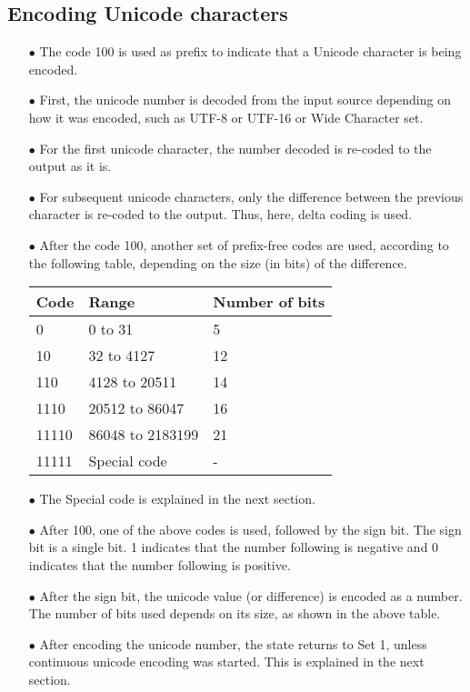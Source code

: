 \documentclass[]{article}
\begin{document}
\subsection{Encoding Unicode characters}
\begin{itemize}
	\item[$\bullet$] The code 100 is used as prefix to indicate that a Unicode character is being encoded.
	\item[$\bullet$] First, the unicode number is decoded from the input source depending on how it was encoded, such as UTF-8 or UTF-16 or Wide Character set.
	\item[$\bullet$] For the first unicode character, the number decoded is re-coded to the output as it is.
	\item[$\bullet$] For subsequent unicode characters, only the difference between the previous character is re-coded to the output.  Thus, here, delta coding is used.
	\item[$\bullet$] After the code 100, another set of prefix-free codes are used, according to the following table, depending on the size (in bits) of the difference.
	\item[] \begin{tabular}{ | l | l | l |} \hline
	﻿\textbf{Code} & ﻿\textbf{Range} & ﻿\textbf{Number of bits} \\ \hline
	0 & 0 to 31 & 5 \\ \hline
	10 & 32 to 4127 & 12 \\ \hline
	110 & 4128 to 20511 & 14 \\ \hline
	1110 & 20512 to 86047 & 16 \\ \hline
	11110 & 86048 to 2183199 & 21 \\ \hline
	11111 & Special code & - \\ \hline
    \end{tabular}
	\item[$\bullet$] The Special code is explained in the next section.
	\item[$\bullet$] After 100, one of the above codes is used, followed by the sign bit.  The sign bit is a single bit.  1 indicates that the number following is negative and 0 indicates that the number following is positive.
	\item[$\bullet$] After the sign bit, the unicode value (or difference) is encoded as a number.  The number of bits used depends on its size, as shown in the above table.
	\item[$\bullet$] After encoding the unicode number, the state returns to Set 1, unless continuous unicode encoding was started.  This is explained in the next section.
\end{itemize}
\end{document}
